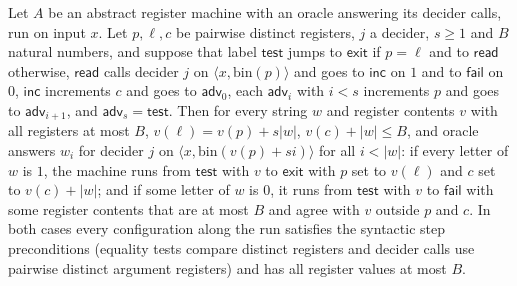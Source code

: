 \begin{theorem}
\label{Complexity.LogProg.epad_ones_loop}
\leanok
{}
Let $A$ be an abstract register machine with an oracle answering its decider calls, run on input
$x$. Let $p, \ell, c$ be pairwise distinct registers, $j$ a decider, $s \ge 1$ and $B$ natural
numbers, and suppose that label $\mathsf{test}$ jumps to $\mathsf{exit}$ if $p = \ell$ and to
$\mathsf{read}$ otherwise, $\mathsf{read}$ calls decider $j$ on $\langle x, \mathrm{bin}(p)\rangle$
and goes to $\mathsf{inc}$ on $1$ and to $\mathsf{fail}$ on $0$, $\mathsf{inc}$ increments $c$ and
goes to $\mathsf{adv}_0$, each $\mathsf{adv}_i$ with $i < s$ increments $p$ and goes to
$\mathsf{adv}_{i+1}$, and $\mathsf{adv}_s = \mathsf{test}$. Then for every string $w$ and register
contents $v$ with all registers at most $B$, $v(\ell) = v(p) + s|w|$, $v(c) + |w| \le B$, and
oracle answers $w_i$ for decider $j$ on $\langle x, \mathrm{bin}(v(p) + s i)\rangle$ for all
$i < |w|$: if every letter of $w$ is $1$, the machine runs from $\mathsf{test}$ with $v$ to
$\mathsf{exit}$ with $p$ set to $v(\ell)$ and $c$ set to $v(c) + |w|$; and if some letter of $w$ is
$0$, it runs from $\mathsf{test}$ with $v$ to $\mathsf{fail}$ with some register contents that are
at most $B$ and agree with $v$ outside $p$ and $c$. In both cases every configuration along the run satisfies the syntactic step preconditions (equality tests compare distinct registers and decider calls use pairwise distinct argument registers) and has all register values at most $B$.
\end{theorem}

